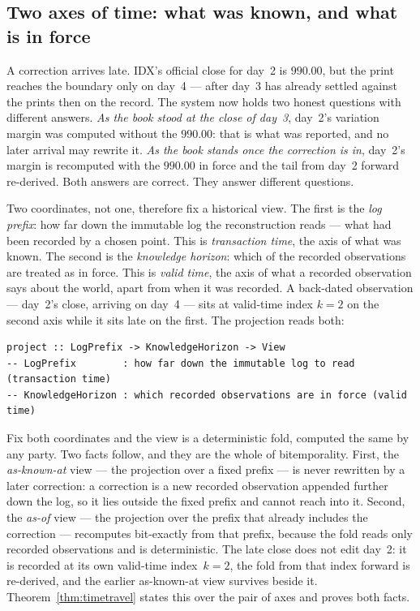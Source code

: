 \documentclass[11pt,a4paper]{article}
\begin{document}
\subsection{Two axes of time: what was known, and what is in force}\label{sec:bitemporal}

A correction arrives late. IDX's official close for day~2 is $990.00$, but the print
reaches the boundary only on day~4 --- after day~3 has already settled against the
prints then on the record. The system now holds two honest questions with different
answers. \emph{As the book stood at the close of day~3}, day~2's variation margin was
computed without the $990.00$: that is what was reported, and no later arrival may rewrite
it. \emph{As the book stands once the correction is in}, day~2's margin is recomputed with
the $990.00$ in force and the tail from day~2 forward re-derived. Both answers are correct.
They answer different questions.

Two coordinates, not one, therefore fix a historical view. The first is the \emph{log
prefix}: how far down the immutable log the reconstruction reads --- what had been recorded
by a chosen point. This is \emph{transaction time}, the axis of what was known. The second
is the \emph{knowledge horizon}: which of the recorded observations are treated as in
force. This is \emph{valid time}, the axis of what a recorded observation says about the
world, apart from when it was recorded. A back-dated observation --- day~2's close, arriving
on day~4 --- sits at valid-time index $k=2$ on the second axis while it sits late on the
first. The projection reads both:

\begin{lstlisting}
project :: LogPrefix -> KnowledgeHorizon -> View
-- LogPrefix        : how far down the immutable log to read   (transaction time)
-- KnowledgeHorizon : which recorded observations are in force (valid time)
\end{lstlisting}

Fix both coordinates and the view is a deterministic fold, computed the same by any party.
Two facts follow, and they are the whole of bitemporality. First, the \emph{as-known-at}
view --- the projection over a fixed prefix --- is never rewritten by a later correction: a
correction is a new recorded observation appended further down the log, so it lies outside
the fixed prefix and cannot reach into it. Second, the \emph{as-of} view --- the projection
over the prefix that already includes the correction --- recomputes bit-exactly from that
prefix, because the fold reads only recorded observations and is deterministic. The late
close does not edit day~2: it is recorded at its own valid-time index~$k=2$, the fold from
that index forward is re-derived, and the earlier as-known-at view survives beside it.
Theorem~\ref{thm:timetravel} states this over the pair of axes and proves both facts.
\end{document}
